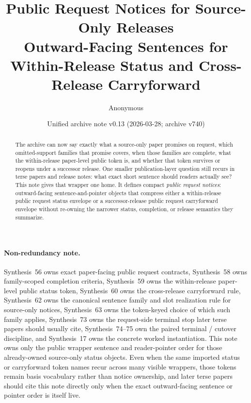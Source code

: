 \documentclass[11pt]{article}
\title{Public Request Notices for Source-Only Releases\\\large Outward-Facing Sentences for Within-Release Status and Cross-Release Carryforward}
\author{Anonymous}
\date{Unified archive note v0.13 (2026-03-28; archive v740)}
\begin{document}
\maketitle

\begin{abstract}
The archive can now say exactly what a source-only paper promises on request, which omitted-support families that promise covers, when those families are complete, what the within-release paper-level public token is, and whether that token survives or reopens under a successor release. One smaller publication-layer question still recurs in terse papers and release notes: what exact short sentence should readers actually see? This note gives that wrapper one home. It defines compact \emph{public request notices}: outward-facing sentence-and-pointer objects that compress either a within-release public request status envelope or a successor-release public request carryforward envelope without re-owning the narrower status, completion, or release semantics they summarize.
\end{abstract}

\paragraph{Non-redundancy note.}
Synthesis~56 owns exact paper-facing public request contracts, Synthesis~58 owns family-scoped completion criteria, Synthesis~59 owns the within-release paper-level public status token, Synthesis~60 owns the cross-release carryforward rule, Synthesis~62 owns the canonical sentence family and slot realization rule for source-only notices, Synthesis~63 owns the token-keyed choice of which such family applies, Synthesis~73 owns the request-side terminal stop later terse papers should usually cite, Synthesis~74--75 own the paired terminal / cutover discipline, and Synthesis~17 owns the concrete worked instantiation.\cite{series:publicrequestcontracts,series:requestfulfillmentcertificates,series:publicrequeststatusenvelopes,series:publicrequestcarryforward,series:publicrequestnoticenormalforms,series:publicrequestnoticeselections,series:publicrequestresponsepacketrefreshresponsepacketclosureverdicts,series:pairedterminalcitationdiscipline,series:pairedterminalcutoverrule,series:workedexample}
This note owns only the public wrapper sentence and reader-pointer order for those already-owned source-only status objects. Even when the same imported status or carryforward token names recur across many visible wrappers, those tokens remain basis vocabulary rather than notice ownership, and later terse papers should cite this note directly only when the exact outward-facing sentence or pointer order is itself live.
\end{document}
